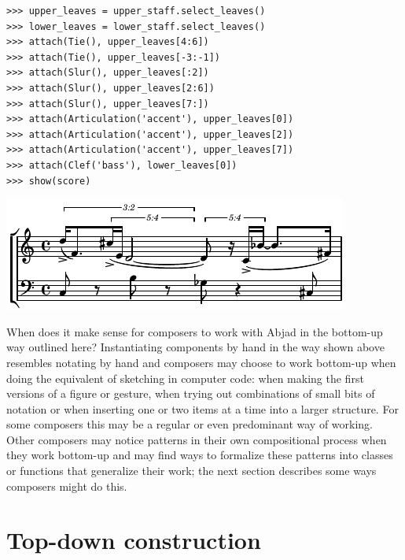 \documentclass{article}
\begin{document}
\begin{lstlisting}
>>> upper_leaves = upper_staff.select_leaves()
>>> lower_leaves = lower_staff.select_leaves()
>>> attach(Tie(), upper_leaves[4:6])
>>> attach(Tie(), upper_leaves[-3:-1])
>>> attach(Slur(), upper_leaves[:2])
>>> attach(Slur(), upper_leaves[2:6])
>>> attach(Slur(), upper_leaves[7:])
>>> attach(Articulation('accent'), upper_leaves[0])
>>> attach(Articulation('accent'), upper_leaves[2])
>>> attach(Articulation('accent'), upper_leaves[7])
>>> attach(Clef('bass'), lower_leaves[0])
>>> show(score)
\end{lstlisting}
\includegraphics{assets/lilypond-b8f044cb7178ea31797238c629d3f54c.pdf}

\noindent When does it make sense for composers to work with Abjad in the
bottom-up way outlined here? Instantiating components by hand in the way shown
above resembles notating by hand and composers may choose to work bottom-up
when doing the equivalent of sketching in computer code: when making the first
versions of a figure or gesture, when trying out combinations of small bits of
notation or when inserting one or two items at a time into a larger structure.
For some composers this may be a regular or even predominant way of working.
Other composers may notice patterns in their own compositional process when
they work bottom-up and may find ways to formalize these patterns into classes
or functions that generalize their work; the next section describes some ways
composers might do this.


\section{Top-down construction} \label{sec:top-down}
\end{document}
